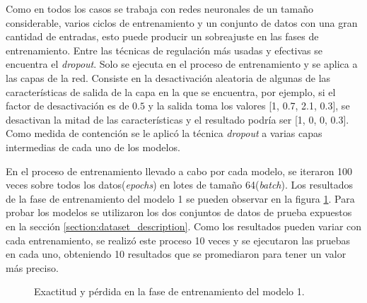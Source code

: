 Como en todos los casos se trabaja con redes neuronales de un tamaño considerable, varios ciclos de entrenamiento y un conjunto de datos con una gran cantidad de entradas, esto puede producir un sobreajuste en las fases de entrenamiento. Entre las técnicas de regulación m\'as usadas y efectivas se encuentra el \textit{dropout}. Solo se ejecuta en el proceso de entrenamiento y se aplica a las capas de la red. Consiste en la desactivaci\'on aleatoria de algunas de las características de salida de la capa en la que se encuentra, por ejemplo, si el factor de desactivaci\'on es de $0.5$ y la salida toma los valores [1, 0.7, 2.1,  0.3], se desactivan la mitad de las características y el resultado podría ser [1, 0, 0, 0.3]. Como medida de contención se le aplicó la técnica \textit{dropout} a varias capas intermedias de cada uno de los modelos.

En el proceso de entrenamiento llevado a cabo por cada modelo, se iteraron 100 veces sobre todos los datos(\textit{epochs}) en lotes de tamaño 64(\textit{batch}). Los resultados de la fase de entrenamiento del modelo 1 se pueden observar en la figura \ref{fig:4x5_train}. Para probar los modelos se utilizaron los dos conjuntos de datos de prueba expuestos en la sección \ref{section:dataset_description}. Como los resultados pueden variar con cada entrenamiento, se realizó este proceso 10 veces y se ejecutaron las pruebas en cada uno, obteniendo 10 resultados que se promediaron para tener un valor m\'as preciso.

\begin{figure}[t]
    \centering

    \caption{Exactitud y pérdida en la fase de entrenamiento del modelo 1.}
    \label{fig:4x5_train}
\end{figure}

